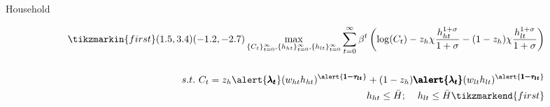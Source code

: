 \documentclass[11pt,aspectratio=169]{beamer}
\begin{document}
\begin{frame}{Household}
\hypertarget{backhh}{}
\vspace{2mm}
\begin{minipage}[t!]{1\textwidth}
	\begin{align*}
	\tikzmarkin{first}(1.5,3.4)(-1.2,-2.7)
 \max_{\{C_t\}_{t=0}^\infty, \{h_{ht}\}_{t=0}^\infty, \{h_{lt}\}_{t=0}^\infty} \sum_{t=0}^\infty \beta^t \left(\log(C_t)-z_h\chi\frac{h_{ht}^{1+\sigma}}{1+\sigma}-(1-z_h)\chi\frac{h_{lt}^{1+\sigma}}{1+\sigma}\right) %
\\
\vspace{4mm}
\\
s.t.\ C_t=z_h \alert{\pmb{\lambda_t}} (w_{ht}h_{ht})^{\alert{\pmb{1-\tau_{lt}}}}+(1-z_h) \pmb{\alert{\lambda_t}} (w_{lt}h_{lt})^{\alert{\pmb{1-\tau_{lt}}}}%
\\
\hspace{2mm}\ h_{ht}\leq \bar{H}; \hspace{4mm} h_{lt}\leq \bar{H}
	\tikzmarkend{first}
	\end{align*}
\end{minipage}

%


\end{frame}
\end{document}

